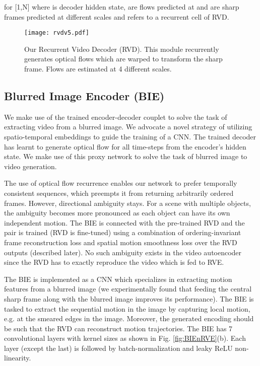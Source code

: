 \documentclass[10pt,twocolumn,letterpaper]{article}
\begin{document}
\noindent for   [1,N] where  is decoder hidden state,  are flows predicted at  and  are sharp frames predicted at different scales and  refers to a recurrent cell of RVD.

\begin{figure}
\begin{center}
   \texttt{[image: rvdv5.pdf]}
\end{center}
\vspace{-4mm}
   \caption{Our Recurrent Video Decoder (RVD). This module recurrently generates optical flows which are warped to transform the sharp frame. Flows are estimated at 4 different scales.}
\label{fig:RVD}
\end{figure}

\subsection{Blurred Image Encoder (BIE)}
\label{sec:bie}



We make use of the trained encoder-decoder couplet to solve the task of extracting video from a blurred image. 
We advocate a novel strategy of utilizing spatio-temporal embeddings to guide the training of a CNN. The trained decoder has learnt to generate optical flow for all time-steps from the encoder's hidden state. We make use of this proxy network to solve the task of blurred image to video generation.


The use of optical flow recurrence enables our network to prefer temporally consistent sequences, which preempts it from returning arbitrarily ordered frames. However, directional ambiguity stays.
For a scene with multiple objects, the ambiguity becomes more pronounced as each object can have its own independent motion. The BIE is connected with the pre-trained RVD and the pair is trained (RVD is fine-tuned) using a combination of ordering-invariant frame reconstruction loss and spatial motion smoothness loss over the RVD outputs (described later). No such ambiguity exists in the video autoencoder since the RVD has to exactly reproduce the video which is fed to RVE.


The BIE is implemented as a CNN which specializes in extracting motion features from a blurred image (we experimentally found that feeding the central sharp frame along with the blurred image improves its performance). The BIE is tasked to extract the sequential motion in the image by capturing local motion, e.g. at the smeared edges in the image. Moreover, the generated encoding should be such that the RVD can reconstruct motion trajectories. The BIE has 7 convolutional layers with kernel sizes as shown in Fig. \ref{fig:BIEnRVE}(b). Each layer (except the last) is followed by batch-normalization and leaky ReLU non-linearity.
\end{document}
